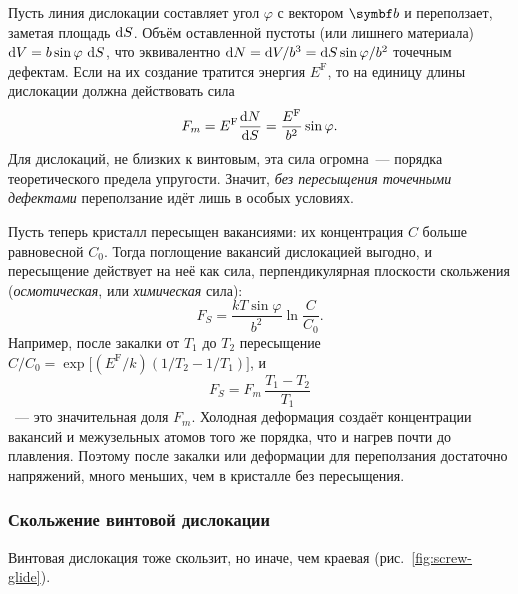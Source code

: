 \begin{podrobnee}
Пусть линия дислокации составляет угол $\varphi$ с вектором $\vb b$ и
переползает, заметая площадь $\mathop{}\!\mathrm{d} S$. Объём оставленной пустоты (или
лишнего материала) $\mathop{}\!\mathrm{d} V=b\sin\varphi\,\mathop{}\!\mathrm{d} S$, что эквивалентно
$\mathop{}\!\mathrm{d} N=\mathop{}\!\mathrm{d} V/b^3=\mathop{}\!\mathrm{d} S\sin\varphi/b^2$ точечным дефектам. Если на их создание
тратится энергия $E^{\mathrm F}$, то на единицу длины дислокации должна
действовать сила
\[
F_m=E^{\mathrm F}\frac{\mathop{}\!\mathrm{d} N}{\mathop{}\!\mathrm{d} S}=\frac{E^{\mathrm F}}{b^2}\sin\varphi .
\]
Для дислокаций, не близких к винтовым, эта сила огромна~— порядка
теоретического предела упругости. Значит, \emph{без пересыщения
точечными дефектами} переползание идёт лишь в особых условиях.

Пусть теперь кристалл пересыщен вакансиями: их концентрация $C$ больше
равновесной $C_0$. Тогда поглощение вакансий дислокацией выгодно, и
пересыщение действует на неё как сила, перпендикулярная плоскости
скольжения (\emph{осмотическая}, или \emph{химическая} сила):
\[
F_S=\frac{kT\sin\varphi}{b^2}\ln\frac{C}{C_0} .
\]
Например, после закалки от $T_1$ до $T_2$ пересыщение
$C/C_0=\exp\bigl[(E^{\mathrm F}/k)(1/T_2-1/T_1)\bigr]$, и
\[
F_S=F_m\,\frac{T_1-T_2}{T_1}
\]
~— это значительная доля $F_m$. Холодная деформация создаёт концентрации
вакансий и межузельных атомов того же порядка, что и нагрев почти до
плавления. Поэтому после закалки или деформации для переползания
достаточно напряжений, много меньших, чем в кристалле без пересыщения.
\end{podrobnee}

\subsubsection{Скольжение винтовой дислокации}

Винтовая дислокация тоже скользит, но иначе, чем краевая
(рис.~\ref{fig:screw-glide}).

